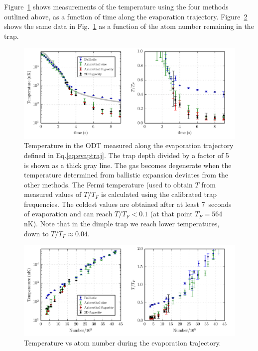 Figure~\ref{fig:evap-data} shows measurements of the temperature using the four
methods outlined above, as a function of time along the evaporation trajectory.
Figure~\ref{fig:evap-data-num} shows the same data in Fig.~\ref{fig:evap-data}
as a function of the atom number remaining in the trap. 
\begin{figure}
    \centering
\includegraphics[width=\textwidth]{../figures/evap/evap-data.png}
\caption{\small Temperature in the ODT measured along the evaporation
trajectory defined in Eq.\ref{eq:evaptraj}.  The trap depth divided by a factor
of 5 is shown as a thick gray line. The gas becomes degenerate when the
temperature determined from ballistic expansion deviates from the other
methods.  The Fermi temperature (used to obtain $T$ from measured values of
$T/T_{F}$ is calculated using the calibrated trap frequencies.  The coldest
values are obtained after at least 7~seconds of evaporation and can reach
$T/T_{F}<0.1$ (at that point $T_{F}=564\,$nK).  Note that in the dimple trap we reach
lower temperatures, down to $T/T_{F}\approx 0.04$.  }
\label{fig:evap-data}
\end{figure}
\begin{figure}
    \centering
\includegraphics[width=\textwidth]{../figures/evap/evap-data-num.png}
\caption{\small Temperature vs atom number during the evaporation trajectory.}
\label{fig:evap-data-num}
\end{figure}


